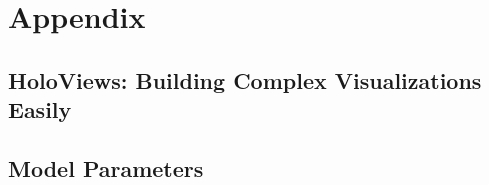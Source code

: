 \chapter{Appendix}

\section{HoloViews: Building Complex Visualizations Easily} \label{SciPyPaper}



\section{Model Parameters} \label{Appendix:Parameters}

